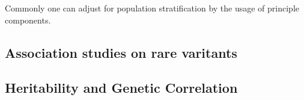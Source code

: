 Commonly one can adjust for population stratification by the usage of principle components.





\subsection{Association studies on rare varitants}
\label{sub:association_studies_on_rare_varitants}

\subsection{Heritability and Genetic Correlation}
\label{sub:heritability_and_genetic_correlation}

